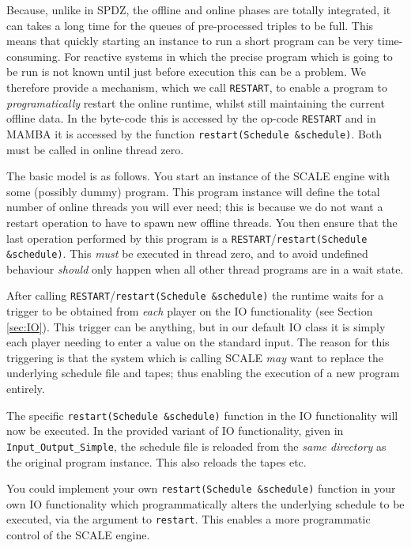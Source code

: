 \label{sec:restart}
Because, unlike in SPDZ, the offline and online phases are totally
integrated, it can takes a long time for the queues of pre-processed
triples to be full. This means that quickly starting an instance to
run a short program can be very time-consuming. For reactive systems
in which the precise program which is going to be run is not known
until just before execution this can be a problem.
We therefore provide a mechanism, which we call \verb+RESTART+, to
enable a program to {\em programatically} restart the online runtime, whilst 
still maintaining the current offline data.
In the byte-code this is accessed by the op-code \verb+RESTART+
and in MAMBA it is accessed by the function \verb+restart(Schedule &schedule)+.
Both must be called in online thread zero.

The basic model is as follows.
You start an instance of the SCALE engine with some (possibly
dummy) program. This program instance will define the total number
of online threads you will ever need; this is because we do not
want a restart operation to have to spawn new offline threads.
You then ensure that the last operation performed by this
program is a \verb+RESTART+/\verb+restart(Schedule &schedule)+.
This {\em must} be executed in thread zero, and to avoid undefined
behaviour {\em should} only happen when all other thread programs
are in a wait state.

After calling \verb+RESTART+/\verb+restart(Schedule &schedule)+
the runtime waits for a trigger to be obtained
from {\em each} player on the IO functionality (see
Section \ref{sec:IO}).
This trigger can be anything, but in our default IO class it
is simply each player needing to enter a value on the standard
input.
The reason for this triggering is that the system which is
calling SCALE {\em may} want to replace the underlying
schedule file and tapes; thus enabling the execution of
a new program entirely.

The specific \verb+restart(Schedule &schedule)+ function in the  
IO functionality will now be executed.
In the provided variant of IO functionality, given in
\verb+Input_Output_Simple+, the schedule file is reloaded 
from the {\em same directory} as the original program instance.
This also reloads the tapes etc.

You could implement your own \verb+restart(Schedule &schedule)+ function in your
own IO functionality which programmatically alters
the underlying schedule to be executed, via the argument to \verb+restart+. 
This enables a more programmatic control of the SCALE engine.

